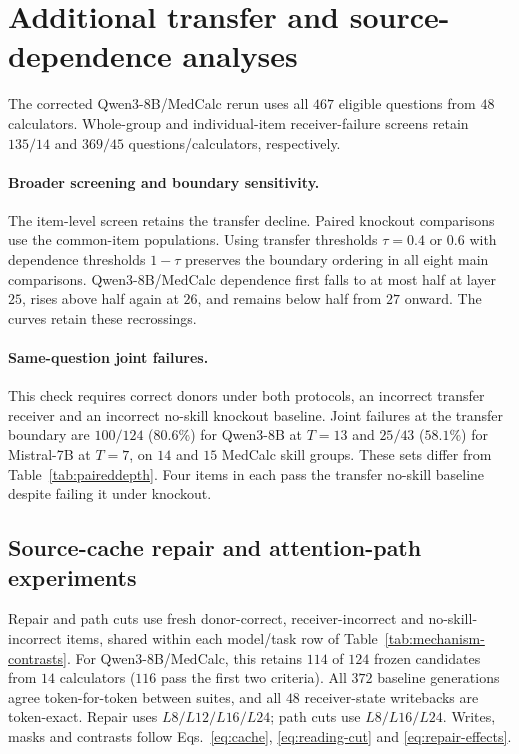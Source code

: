 \section{Additional transfer and source-dependence analyses}
\label{app:fullscale}



The corrected Qwen3-8B/MedCalc rerun uses all $467$ eligible questions
from $48$ calculators. Whole-group and individual-item receiver-failure
screens retain $135/14$ and $369/45$ questions/calculators, respectively.

\paragraph{Broader screening and boundary sensitivity.}
The item-level screen retains the transfer decline. Paired knockout
comparisons use the common-item populations. Using transfer thresholds
$\tau=0.4$ or $0.6$ with dependence thresholds $1-\tau$ preserves the
boundary ordering in all eight main comparisons. Qwen3-8B/MedCalc dependence
first falls to at most half at layer $25$, rises above half again at $26$,
and remains below half from $27$ onward. The curves retain these recrossings.

\paragraph{Same-question joint failures.}
\label{app:joint-failure}
This check requires correct donors under both protocols, an incorrect
transfer receiver and an incorrect no-skill knockout baseline.
Joint failures at the transfer boundary are $100/124$ ($80.6\%$) for
Qwen3-8B at $T=13$ and $25/43$ ($58.1\%$) for Mistral-7B at $T=7$,
on $14$ and $15$ MedCalc skill groups. These sets differ from
Table~\ref{tab:paireddepth}. Four items in each pass the transfer
no-skill baseline despite failing it under knockout.

\subsection{Source-cache repair and attention-path experiments}
\label{app:mechanism}

Repair and path cuts use fresh donor-correct, receiver-incorrect and
no-skill-incorrect items, shared within each model/task row of
Table~\ref{tab:mechanism-contrasts}. For Qwen3-8B/MedCalc, this retains
$114$ of $124$ frozen candidates from $14$ calculators ($116$ pass the
first two criteria). All $372$ baseline generations agree token-for-token
between suites, and all $48$ receiver-state writebacks are token-exact.
Repair uses $L8/L12/L16/L24$; path cuts use $L8/L16/L24$.
Writes, masks and contrasts follow Eqs.~\eqref{eq:cache},
\eqref{eq:reading-cut} and \eqref{eq:repair-effects}.

